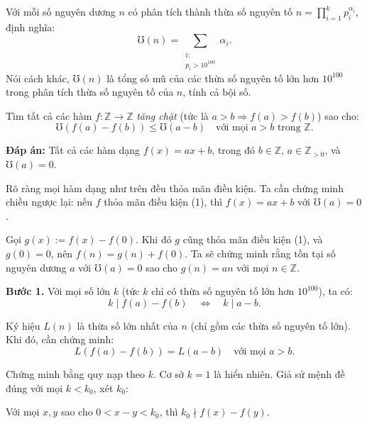 \ifshowproblemandsoln
\ifshowproblem\begin{problem}\label{problem:IMO-2015-SL-P8}\fi
\ifshowsoln\begin{problem}\fi
    Với mỗi số nguyên dương \( n \) có phân tích thành thừa số nguyên tố \( n = \prod_{i = 1}^{k} p_i^{\alpha_i} \), định nghĩa:
    \[
        \mho(n) = \sum_{\substack{i:\\ p_i > 10^{100}}} \alpha_i.
    \]
    Nói cách khác, \( \mho(n) \) là tổng số mũ của các thừa số nguyên tố lớn hơn \( 10^{100} \)
    trong phân tích thừa số nguyên tố của \( n \), tính cả bội số.
    
    Tìm tất cả các hàm \( f: \mathbb{Z} \to \mathbb{Z} \) \textit{tăng chặt} (tức là \( a > b \Rightarrow f(a) > f(b) \)) sao cho:
    \[
        \mho(f(a) - f(b)) \le \mho(a - b) \quad \text{với mọi } a > b \text{ trong } \mathbb{Z}.
    \]    
\end{problem}
\fi

\ifshowsoln
\begin{soln}\footnotemark
    \textbf{Đáp án:} Tất cả các hàm dạng \( f(x) = ax + b \), trong đó \( b \in \mathbb{Z} \), \( a \in \mathbb{Z}_{>0} \), và \( \mho(a) = 0 \).

    Rõ ràng mọi hàm dạng như trên đều thỏa mãn điều kiện. Ta cần chứng minh chiều ngược lại:
    nếu \( f \) thỏa mãn điều kiện (1), thì \( f(x) = ax + b \) với \( \mho(a) = 0 \).

    Gọi \( g(x) := f(x) - f(0) \). Khi đó \( g \) cũng thỏa mãn điều kiện (1), và \( g(0) = 0 \), nên \( f(n) = g(n) + f(0) \).
    Ta sẽ chứng minh rằng tồn tại số nguyên dương \( a \) với \( \mho(a) = 0 \) sao cho \( g(n) = an \) với mọi \( n \in \mathbb{Z} \).

    \textbf{Bước 1.} Với mọi số lớn \( k \) (tức \( k \) chỉ có thừa số nguyên tố lớn hơn \( 10^{100} \)), ta có:
    \[
        k \mid f(a) - f(b) \quad \Leftrightarrow \quad k \mid a - b.
    \]

    Ký hiệu \( L(n) \) là thừa số lớn nhất của \( n \) (chỉ gồm các thừa số nguyên tố lớn). Khi đó, cần chứng minh:
    \[
        L(f(a) - f(b)) = L(a - b) \quad \text{với mọi } a > b.
    \]

    Chứng minh bằng quy nạp theo \( k \). Cơ sở \( k = 1 \) là hiển nhiên. Giả sử mệnh đề đúng với mọi \( k < k_0 \), xét \( k_0 \):

    \begin{claim*}
        Với mọi \( x, y \) sao cho \( 0 < x - y < k_0 \), thì \( k_0 \nmid f(x) - f(y) \).
    \end{claim*}


\end{soln}
\end{problem}
